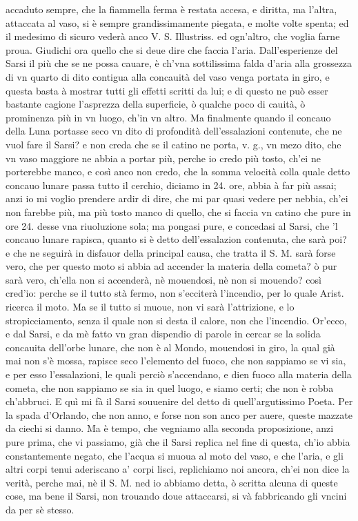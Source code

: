 \documentclass[11pt,twoside,openany]{book}
\begin{document}
accaduto sempre, che la fiammella ferma è restata accesa, e diritta, ma l'altra, attaccata al vaso, si è sempre grandissimamente piegata, e molte volte spenta; ed il medesimo di sicuro vederà anco V. S. Illustriss. ed ogn'altro, che voglia farne proua. Giudichi ora quello che si deue dire che faccia l'aria. Dall'esperienze del Sarsi il più che se ne possa cauare, è ch'vna sottilissima falda d'aria alla grossezza di vn quarto di dito contigua alla concauità del vaso venga portata in giro, e questa basta à mostrar tutti gli effetti scritti da lui; e di questo ne può esser bastante cagione l'asprezza della superficie, ò qualche poco di cauità, ò prominenza più in vn luogo, ch'in vn altro. Ma finalmente quando il concauo della Luna portasse seco vn dito di profondità dell'essalazioni contenute, che ne vuol fare il Sarsi? e non creda che se il catino ne porta, v. g., vn mezo dito, che vn vaso maggiore ne abbia a portar più, perche io credo più tosto, ch'ei ne porterebbe manco, e così anco non credo, che la somma velocità colla quale detto concauo lunare passa tutto il cerchio, diciamo in 24. ore, abbia à far più assai; anzi io mi voglio prendere ardir di dire, che mi par quasi vedere per nebbia, ch'ei non farebbe più, ma più tosto manco di quello, che si faccia vn catino che pure in ore 24. desse vna riuoluzione sola; ma pongasi pure, e concedasi al Sarsi, che 'l concauo lunare rapisca, quanto si è detto dell'essalazion contenuta, che sarà poi? e che ne seguirà in disfauor della principal causa, che tratta il S. M. sarà forse vero, che per questo moto si abbia ad accender la materia della cometa? ò pur sarà vero, ch'ella non si accenderà, nè mouendosi, nè non si mouendo? così cred'io: perche se il tutto stà fermo, non s'ecciterà l'incendio, per lo quale Arist. ricerca il moto. Ma se il tutto si muoue, non vi sarà l'attrizione, e lo stropicciamento, senza il quale non si desta il calore, non che l'incendio. Or'ecco, e dal Sarsi, e da mè fatto vn gran dispendio di parole in cercar se la solida concauita dell'orbe lunare, che non è al Mondo, mouendosi in giro, la qual già mai non s'è mossa, rapisce seco l'elemento del fuoco, che non sappiamo se vi sia, e per esso l'essalazioni, le quali perciò s'accendano, e dien fuoco alla materia della cometa, che non sappiamo se sia in quel luogo, e siamo certi; che non è robba ch'abbruci. E quì mi fà il Sarsi souuenire del detto di quell'argutissimo Poeta. Per la spada d'Orlando, che non anno, e forse non son anco per auere, queste mazzate da ciechi si danno. Ma è tempo, che vegniamo alla seconda proposizione, anzi pure prima, che vi passiamo, già che il Sarsi replica nel fine di questa, ch'io abbia constantemente negato, che l'acqua si muoua al moto del vaso, e che l'aria, e gli altri corpi tenui aderiscano a' corpi lisci, replichiamo noi ancora, ch'ei non dice la verità, perche mai, nè il S. M. ned io abbiamo detta, ò scritta alcuna di queste cose, ma bene il Sarsi, non trouando doue attaccarsi, si và fabbricando gli vncini da per sè stesso.
\end{document}
